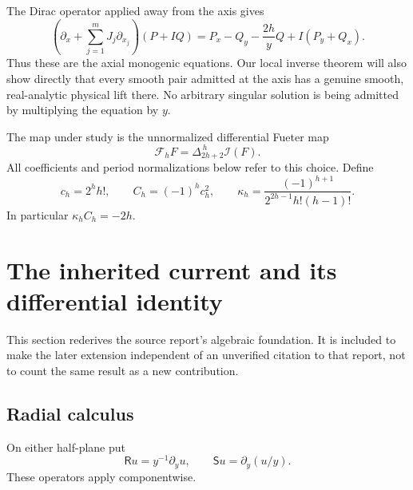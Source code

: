 \documentclass[11pt,a4paper]{article}
\numberwithin{equation}{section}
\theoremstyle{definition}
\theoremstyle{remark}
\newcommand{\Fu}{\mathcal F_h}
\newcommand{\Rop}{\mathsf R}
\newcommand{\Sop}{\mathsf S}
\begin{document}
The Dirac operator applied away from the axis gives
\[
 \left(\partial_x+\sum_{j=1}^mJ_j\partial_{x_j}\right)(P+IQ)
 =P_x-Q_y-\frac{2h}{y}Q+I(P_y+Q_x).
\]
Thus these are the axial monogenic equations. Our local inverse theorem will
also show directly that every smooth pair admitted at the axis has a genuine
smooth, real-analytic physical lift there. No arbitrary singular solution is
being admitted by multiplying the equation by $y$.

The map under study is the unnormalized differential Fueter map
\begin{equation}\label{eq:Fu}
 \Fu F=\Delta_{2h+2}^{\,h}\mathcal I(F).
\end{equation}
All coefficients and period normalizations below refer to this choice.
Define
\begin{equation}\label{eq:constants}
 c_h=2^hh!,\qquad C_h=(-1)^hc_h^2,\qquad
 \kappa_h=\frac{(-1)^{h+1}}{2^{2h-1}h!(h-1)!}.
\end{equation}
In particular $\kappa_hC_h=-2h$.

\section{The inherited current and its differential identity}
\label{sec:current}

This section rederives the source report's algebraic foundation. It is included
to make the later extension independent of an unverified citation to that
report, not to count the same result as a new contribution.

\subsection{Radial calculus}

On either half-plane put
\[
 \Rop u=y^{-1}\partial_yu,
 \qquad \Sop u=\partial_y(u/y).
\]
These operators apply componentwise.
\end{document}
